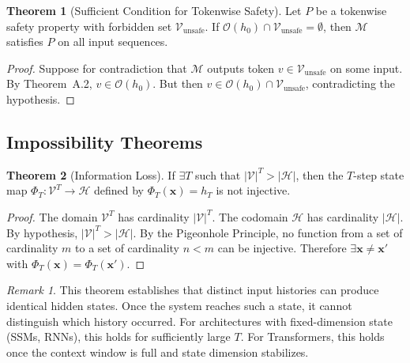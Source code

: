 \documentclass[11pt]{article}
\theoremstyle{definition}
\newtheorem{theorem}{Theorem}[section]
\theoremstyle{remark}
\newtheorem{remark}{Remark}[section]
\begin{document}
\begin{theorem}[Sufficient Condition for Tokenwise Safety]
Let $P$ be a tokenwise safety property with forbidden set $\mathcal{V}_{\text{unsafe}}$. If $\mathcal{O}(h_0) \cap \mathcal{V}_{\text{unsafe}} = \emptyset$, then $\mathcal{M}$ satisfies $P$ on all input sequences.
\end{theorem}

\begin{proof}
Suppose for contradiction that $\mathcal{M}$ outputs token $v \in \mathcal{V}_{\text{unsafe}}$ on some input. By Theorem~A.2, $v \in \mathcal{O}(h_0)$. But then $v \in \mathcal{O}(h_0) \cap \mathcal{V}_{\text{unsafe}}$, contradicting the hypothesis.
\end{proof}

\subsection{Impossibility Theorems}

\begin{theorem}[Information Loss]
If $\exists T$ such that $|\mathcal{V}|^T > |\mathcal{H}|$, then the $T$-step state map $\Phi_T: \mathcal{V}^T \to \mathcal{H}$ defined by $\Phi_T(\mathbf{x}) = h_T$ is not injective.
\end{theorem}

\begin{proof}
The domain $\mathcal{V}^T$ has cardinality $|\mathcal{V}|^T$. The codomain $\mathcal{H}$ has cardinality $|\mathcal{H}|$. By hypothesis, $|\mathcal{V}|^T > |\mathcal{H}|$. By the Pigeonhole Principle, no function from a set of cardinality $m$ to a set of cardinality $n < m$ can be injective. Therefore $\exists \mathbf{x} \neq \mathbf{x}'$ with $\Phi_T(\mathbf{x}) = \Phi_T(\mathbf{x}')$.
\end{proof}

\begin{remark}
This theorem establishes that distinct input histories can produce identical hidden states. Once the system reaches such a state, it cannot distinguish which history occurred. For architectures with fixed-dimension state (SSMs, RNNs), this holds for sufficiently large $T$. For Transformers, this holds once the context window is full and state dimension stabilizes.
\end{remark}
\end{document}
